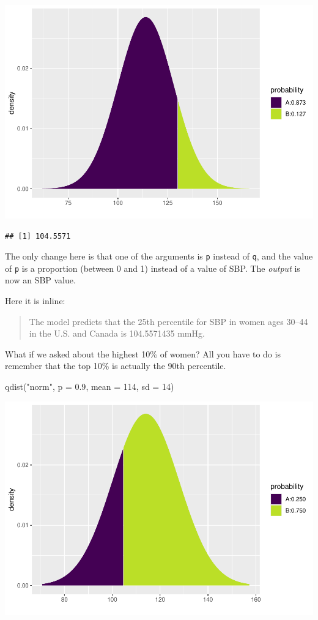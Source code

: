 \documentclass[
]{book}
\newenvironment{Shaded}{\begin{snugshade}}{\end{snugshade}}
\newcommand{\AttributeTok}[1]{\textcolor[rgb]{0.77,0.63,0.00}{#1}}
\newcommand{\DecValTok}[1]{\textcolor[rgb]{0.00,0.00,0.81}{#1}}
\newcommand{\FloatTok}[1]{\textcolor[rgb]{0.00,0.00,0.81}{#1}}
\newcommand{\FunctionTok}[1]{\textcolor[rgb]{0.00,0.00,0.00}{#1}}
\newcommand{\NormalTok}[1]{#1}
\newcommand{\StringTok}[1]{\textcolor[rgb]{0.31,0.60,0.02}{#1}}
\begin{document}
\includegraphics{intro_stats_files/figure-latex/unnamed-chunk-347-1.pdf}

\begin{verbatim}
## [1] 104.5571
\end{verbatim}

The only change here is that one of the arguments is \texttt{p} instead of \texttt{q}, and the value of \texttt{p} is a proportion (between 0 and 1) instead of a value of SBP. The \emph{output} is now an SBP value.

Here it is inline:

\begin{quote}
The model predicts that the 25th percentile for SBP in women ages 30--44 in the U.S. and Canada is 104.5571435 mmHg.
\end{quote}

What if we asked about the highest 10\% of women? All you have to do is remember that the top 10\% is actually the 90th percentile.

\begin{Shaded}
\begin{Highlighting}[]
\FunctionTok{qdist}\NormalTok{(}\StringTok{"norm"}\NormalTok{, }\AttributeTok{p =} \FloatTok{0.9}\NormalTok{, }\AttributeTok{mean =} \DecValTok{114}\NormalTok{, }\AttributeTok{sd =} \DecValTok{14}\NormalTok{)}
\end{Highlighting}
\end{Shaded}

\includegraphics{intro_stats_files/figure-latex/unnamed-chunk-348-1.pdf}
\end{document}
